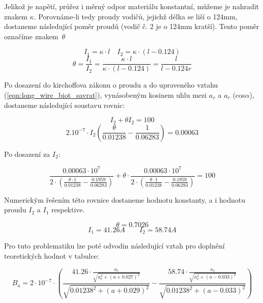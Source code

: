 \documentclass{praktikum}
\begin{document}
Jelikož je napětí, průřez i měrný odpor materiálu konstantní, můžeme je nahradit znakem $\kappa$. Porovnáme-li tedy proudy vodičů, jejichž délka se liší o 124mm, dostaneme následující poměr proudů (vodič č. 2 je o 124mm kratší). Tento poměr označíme znakem~$\theta$

\[ I_1 = \kappa \cdot l \quad I_2 = \kappa \cdot (l-0.124)\]
\[ \theta = \frac{I_1}{I_2} = \frac{\kappa \cdot l}{\kappa \cdot (l-0.124)} =  \frac{l}{l-0.124r}\]

Po dosazení do kirchoffova zákonu o proudu a do upraveného vztahu (\ref{eqn:long_wire_biot_savrat}), vynásobeným kosinem uhlu mezi $a_v$ a $a_r$ (cos$\alpha$), dostaneme následující soustavu rovnic:

\[ I_2 + \theta I_2 = 100 \]
\[ 2.10^{-7} \cdot I_2 \left(\frac{\theta}{0.01238}-\frac{1}{0.06283}\right) = 0.00063\]

Po dosazení za $I_2$:

\[ \frac{0.00063\cdot 10^{7}}{2\cdot \left(\frac{\theta \cdot 1}{0.01238}-\frac{0.1959}{0.06283}\right)} + \theta \cdot \frac{0.00063\cdot 10^{7}}{2\cdot \left(\frac{\theta\cdot 1}{0.01238}-\frac{0.1959}{0.06283}\right)} = 100 \]

Numerickým řešením této rovnice dostaneme hodnotu konstanty, a i hodnotu proudu $I_2$ a $I_1$ respektive.

\[ \theta = 0.7026 \]
\[ I_1 = 41.26 A \quad \quad I_2 = 58.74 A \]

Pro tuto problematiku lze poté odvodin následující vztah pro doplnění teoretických hodnot v tabulce:

\begin{equation}
\label{eqn:calc_oppositewire_magnetic}
B_a = 2 \cdot 10^{-7} \cdot \left(\frac{41.26\cdot \frac{a_v}{\sqrt{a_v^2+(a+0.027)^2}}}{\sqrt{0.01238^2 + (a+0.029)^2}} - \frac{58.74\cdot \frac{a_v}{\sqrt{a_v^2+(a-0.033)^2}}}{\sqrt{0.01238^2 + (a-0.033	)^2}}\right)
\end{equation}
\end{document}
